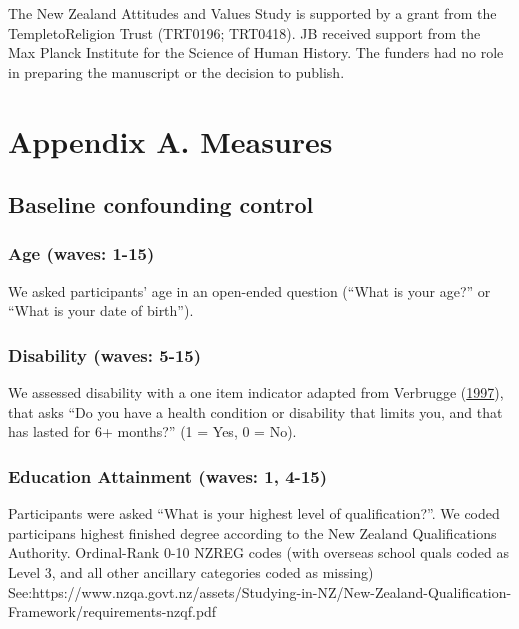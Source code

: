 \documentclass[
  singlecolumn]{report}
\begin{document}
The New Zealand Attitudes and Values Study is supported by a grant from
the TempletoReligion Trust (TRT0196; TRT0418). JB received support from
the Max Planck Institute for the Science of Human History. The funders
had no role in preparing the manuscript or the decision to publish.

\newpage{}

\hypertarget{appendix-a.-measures}{%
\section{Appendix A. Measures}\label{appendix-a.-measures}}

\hypertarget{baseline-confounding-control}{%
\subsection{Baseline confounding
control}\label{baseline-confounding-control}}

\hypertarget{age-waves-1-15}{%
\subsubsection{Age (waves: 1-15)}\label{age-waves-1-15}}

We asked participants' age in an open-ended question (``What is your
age?'' or ``What is your date of birth'').

\hypertarget{disability-waves-5-15}{%
\subsubsection{Disability (waves: 5-15)}\label{disability-waves-5-15}}

We assessed disability with a one item indicator adapted from Verbrugge
(\protect\hyperlink{ref-verbrugge1997}{1997}), that asks ``Do you have a
health condition or disability that limits you, and that has lasted for
6+ months?'' (1 = Yes, 0 = No).

\hypertarget{education-attainment-waves-1-4-15}{%
\subsubsection{Education Attainment (waves: 1,
4-15)}\label{education-attainment-waves-1-4-15}}

Participants were asked ``What is your highest level of
qualification?''. We coded participans highest finished degree according
to the New Zealand Qualifications Authority. Ordinal-Rank 0-10 NZREG
codes (with overseas school quals coded as Level 3, and all other
ancillary categories coded as missing)
See:https://www.nzqa.govt.nz/assets/Studying-in-NZ/New-Zealand-Qualification-Framework/requirements-nzqf.pdf
\end{document}
